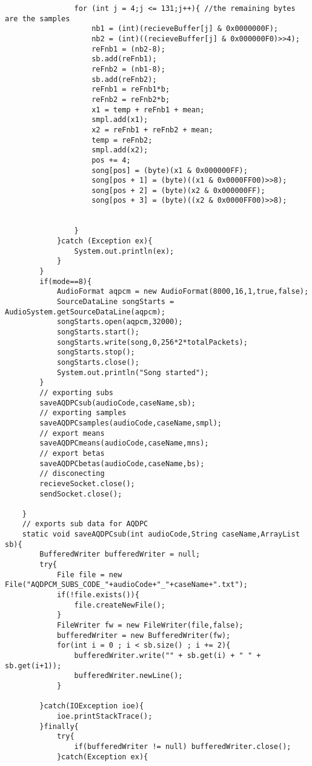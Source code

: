 \documentclass{article}
\begin{document}
\begin{lstlisting}
                for (int j = 4;j <= 131;j++){ //the remaining bytes are the samples
                    nb1 = (int)(recieveBuffer[j] & 0x0000000F);
                    nb2 = (int)((recieveBuffer[j] & 0x000000F0)>>4);
                    reFnb1 = (nb2-8);
                    sb.add(reFnb1);
                    reFnb2 = (nb1-8);
                    sb.add(reFnb2);
                    reFnb1 = reFnb1*b;
                    reFnb2 = reFnb2*b;
                    x1 = temp + reFnb1 + mean;
                    smpl.add(x1);
                    x2 = reFnb1 + reFnb2 + mean;
                    temp = reFnb2;
                    smpl.add(x2);
                    pos += 4;
                    song[pos] = (byte)(x1 & 0x000000FF);
                    song[pos + 1] = (byte)((x1 & 0x0000FF00)>>8);
                    song[pos + 2] = (byte)(x2 & 0x000000FF);
                    song[pos + 3] = (byte)((x2 & 0x0000FF00)>>8);


                }
            }catch (Exception ex){
                System.out.println(ex);
            }
        }
        if(mode==8){
            AudioFormat aqpcm = new AudioFormat(8000,16,1,true,false);
            SourceDataLine songStarts = AudioSystem.getSourceDataLine(aqpcm);
            songStarts.open(aqpcm,32000);
            songStarts.start();
            songStarts.write(song,0,256*2*totalPackets);
            songStarts.stop();
            songStarts.close();
            System.out.println("Song started");
        }
        // exporting subs
        saveAQDPCsub(audioCode,caseName,sb);
        // exporting samples
        saveAQDPCsamples(audioCode,caseName,smpl);
        // export means
        saveAQDPCmeans(audioCode,caseName,mns);
        // export betas
        saveAQDPCbetas(audioCode,caseName,bs);
        // disconecting
        recieveSocket.close();
        sendSocket.close();

    }
    // exports sub data for AQDPC
    static void saveAQDPCsub(int audioCode,String caseName,ArrayList sb){
        BufferedWriter bufferedWriter = null;
        try{
            File file = new File("AQDPCM_SUBS_CODE_"+audioCode+"_"+caseName+".txt");
            if(!file.exists()){
                file.createNewFile();
            }
            FileWriter fw = new FileWriter(file,false);
            bufferedWriter = new BufferedWriter(fw);
            for(int i = 0 ; i < sb.size() ; i += 2){
                bufferedWriter.write("" + sb.get(i) + " " + sb.get(i+1));
                bufferedWriter.newLine();
            }

        }catch(IOException ioe){
            ioe.printStackTrace();
        }finally{
            try{
                if(bufferedWriter != null) bufferedWriter.close();
            }catch(Exception ex){


\end{lstlisting}
\end{document}
